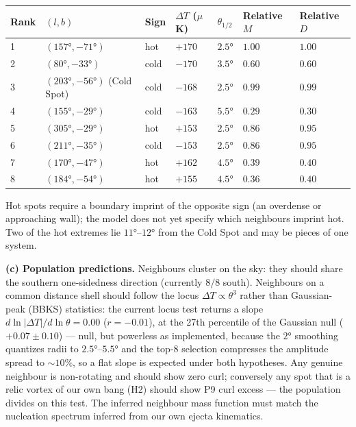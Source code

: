 \documentclass[
]{article}
\begin{document}
\begin{longtable}[]{@{}lllllll@{}}
\toprule
Rank & \((l, b)\) & Sign & \(\Delta T\) (\(\mu\)K) & \(\theta_{1/2}\) &
Relative \(M\) & Relative \(D\)\tabularnewline
\midrule
\endhead
1 & \((157°, -71°)\) & hot & \(+170\) & \(2.5°\) & \(1.00\) &
\(1.00\)\tabularnewline
2 & \((80°, -33°)\) & cold & \(-170\) & \(3.5°\) & \(0.60\) &
\(0.60\)\tabularnewline
3 & \((203°, -56°)\) (Cold Spot) & cold & \(-168\) & \(2.5°\) & \(0.99\)
& \(0.99\)\tabularnewline
4 & \((155°, -29°)\) & cold & \(-163\) & \(5.5°\) & \(0.29\) &
\(0.30\)\tabularnewline
5 & \((305°, -29°)\) & hot & \(+153\) & \(2.5°\) & \(0.86\) &
\(0.95\)\tabularnewline
6 & \((211°, -35°)\) & cold & \(-153\) & \(2.5°\) & \(0.86\) &
\(0.95\)\tabularnewline
7 & \((170°, -47°)\) & hot & \(+162\) & \(4.5°\) & \(0.39\) &
\(0.40\)\tabularnewline
8 & \((184°, -54°)\) & hot & \(+155\) & \(4.5°\) & \(0.36\) &
\(0.40\)\tabularnewline
\bottomrule
\end{longtable}

Hot spots require a boundary imprint of the opposite sign (an overdense
or approaching wall); the model does not yet specify which neighbours
imprint hot. Two of the hot extremes lie \(11°\)--\(12°\) from the Cold
Spot and may be pieces of one system.

\textbf{(c) Population predictions.} Neighbours cluster on the sky: they
should share the southern one-sidedness direction (currently \(8/8\)
south). Neighbours on a common distance shell should follow the locus
\(\Delta T \propto \theta^3\) rather than Gaussian-peak (BBKS)
statistics: the current locus test returns a slope
\(d\ln|\Delta T|/d\ln\theta = 0.00\) (\(r = -0.01\)), at the 27th
percentile of the Gaussian null (\(+0.07 \pm 0.10\)) --- null, but
powerless as implemented, because the \(2°\) smoothing quantizes radii
to \(2.5°\)--\(5.5°\) and the top-8 selection compresses the amplitude
spread to \(\sim\!10\%\), so a flat slope is expected under both
hypotheses. Any genuine neighbour is non-rotating and should show zero
curl; conversely any spot that is a relic vortex of our own bang (H2)
should show P9 curl excess --- the population divides on this test. The
inferred neighbour mass function must match the nucleation spectrum
inferred from our own ejecta kinematics.
\end{document}
